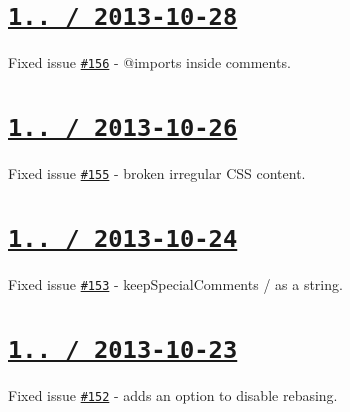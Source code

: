 \section*{\href{https://github.com/jakubpawlowicz/clean-css/compare/v1.1.6...v1.1.7}{\tt 1.. / 2013-\/10-\/28} }


\begin{DoxyItemize}
\item Fixed issue \href{https://github.com/jakubpawlowicz/clean-css/issues/156}{\tt \#156} -\/ {\ttfamily @import}s inside comments.
\end{DoxyItemize}

\section*{\href{https://github.com/jakubpawlowicz/clean-css/compare/v1.1.5...v1.1.6}{\tt 1.. / 2013-\/10-\/26} }


\begin{DoxyItemize}
\item Fixed issue \href{https://github.com/jakubpawlowicz/clean-css/issues/155}{\tt \#155} -\/ broken irregular C\+SS content.
\end{DoxyItemize}

\section*{\href{https://github.com/jakubpawlowicz/clean-css/compare/v1.1.4...v1.1.5}{\tt 1.. / 2013-\/10-\/24} }


\begin{DoxyItemize}
\item Fixed issue \href{https://github.com/jakubpawlowicz/clean-css/issues/153}{\tt \#153} -\/ {\ttfamily keep\+Special\+Comments} {}/{} as a string.
\end{DoxyItemize}

\section*{\href{https://github.com/jakubpawlowicz/clean-css/compare/v1.1.3...v1.1.4}{\tt 1.. / 2013-\/10-\/23} }


\begin{DoxyItemize}
\item Fixed issue \href{https://github.com/jakubpawlowicz/clean-css/issues/152}{\tt \#152} -\/ adds an option to disable rebasing.
\end{DoxyItemize}

